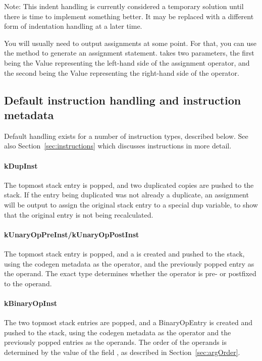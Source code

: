 Note: This indent handling is currently considered a temporary solution until there is time to implement something better. It may be replaced with a different form of indentation handling at a later time.

You will usually need to output assignments at some point. For that, you can use the  method to generate an assignment statement.  takes two parameters, the first being the Value representing the left-hand side of the assignment operator, and the second being the Value representing the right-hand side of the operator.

\subsection{Default instruction handling and instruction metadata}
Default handling exists for a number of instruction types, described below. See also Section~\vref{sec:instructions} which discusses instructions in more detail.
\paragraph{kDupInst}
The topmost stack entry is popped, and two duplicated copies are pushed to the stack. If the entry being duplicated was not already a duplicate, an assignment will be output to assign the original stack entry to a special dup variable, to show that the original entry is not being recalculated.

\paragraph{kUnaryOpPreInst/kUnaryOpPostInst}
The topmost stack entry is popped, and a  is created and pushed to the stack, using the codegen metadata as the operator, and the previously popped entry as the operand. The exact type determines whether the operator is pre- or postfixed to the operand.

\paragraph{kBinaryOpInst}
The two topmost stack entries are popped, and a BinaryOpEntry is created and pushed to the stack, using the codegen metadata as the operator and the previously popped entries as the operands. The order of the operands is determined by the value of the field , as described in Section~\vref{sec:argOrder}.


